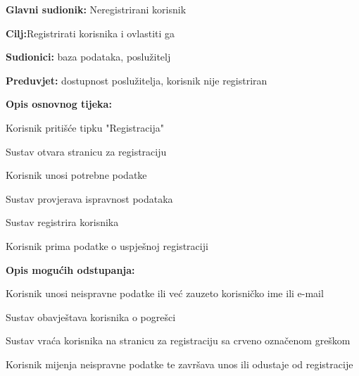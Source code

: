 \noindent {}
\begin{packed_item}
	
	\item \textbf{Glavni sudionik: }Neregistrirani korisnik
	\item  \textbf{Cilj:}Registrirati korisnika i ovlastiti ga
	\item  \textbf{Sudionici:} baza podataka, poslužitelj
	\item  \textbf{Preduvjet:} dostupnost poslužitelja, korisnik nije registriran
	\item  \textbf{Opis osnovnog tijeka:}
	
	\item[] \begin{packed_enum}
		
		\item Korisnik pritišće tipku "Registracija"
		\item Sustav otvara stranicu za registraciju
		\item Korisnik unosi potrebne podatke
		\item Sustav provjerava ispravnost podataka
		\item Sustav registrira korisnika
		\item Korisnik prima podatke o uspješnoj registraciji
		
	\end{packed_enum}
	
	\item  \textbf{Opis mogućih odstupanja:}
	
	\item[] \begin{packed_item}
		
		\item[2.a]Korisnik unosi neispravne podatke ili već zauzeto korisničko ime ili e-mail
		\item[] \begin{packed_enum}
			
			\item Sustav obavještava korisnika o pogrešci 
			\item Sustav vraća korisnika na stranicu za registraciju sa crveno označenom greškom
			\item Korisnik mijenja neispravne podatke te završava unos ili odustaje od registracije
			
		\end{packed_enum}
		
	\end{packed_item}
\end{packed_item}

